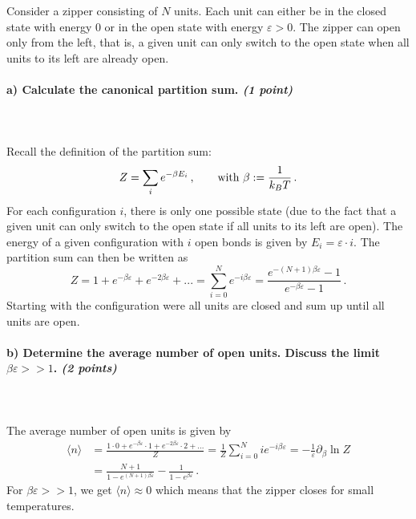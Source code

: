 Consider a zipper consisting of $N$ units. Each unit can either be in the 
closed state with energy 0 or in the open state with energy $\varepsilon>0$.
The zipper can open only from the left, that is, a given unit can only switch
to the open state when all units to its left are already open.

\paragraph{a) Calculate the canonical partition sum. \textit{(1 point)}} \ \\
    \\
    Recall the definition of the partition sum:
    \begin{equation}
        Z=\sum_i e^{-\beta E_i}
        \,, \ \ \ \ \ \ \textnormal{with }
        \beta:=\frac{1}{k_BT} \,.
    \end{equation}
    For each configuration $i$, there is only one possible state 
    (due to the fact that a given unit can only switch to the open state if 
    all units to its left are open). The energy of a given configuration
    with $i$ open bonds is given by $E_i=\varepsilon\cdot i$. The 
    partition sum can then be written as
    \begin{equation}
        Z=1+e^{-\beta\varepsilon}+e^{-2\beta\varepsilon}+... 
        = \sum_{i=0}^N e^{-i\beta\varepsilon} 
        = \frac{e^{-(N+1)\beta\varepsilon} - 1}{e^{-\beta\varepsilon} - 1} \,.
    \end{equation}
    Starting with the configuration were all units are closed and sum up until all units
    are open.

\paragraph{b) Determine the average number of open units. Discuss the limit 
    $\beta\varepsilon>>1$. \textit{(2 points)}} \ \\
    \\
    The average number of open units is given by
    \begin{align}
        \langle n\rangle 
        &=\frac{1\cdot 0+e^{-\beta\varepsilon}\cdot 1+e^{-2\beta\varepsilon}\cdot 2+...}{Z}
        =\frac{1}{Z} \sum_{i=0}^N i e^{-i\beta\varepsilon}
        = -\frac{1}{\varepsilon} \partial_{\beta} \ln Z \\
        &= \frac{N+1}{1-e^{(N+1)\beta\varepsilon}} - \frac{1}{1-e^{\beta\varepsilon}} \,.
    \end{align}
    For $\beta\varepsilon>>1$, we get $\langle n\rangle \approx 0$ which means that the 
    zipper closes for small temperatures.

 
